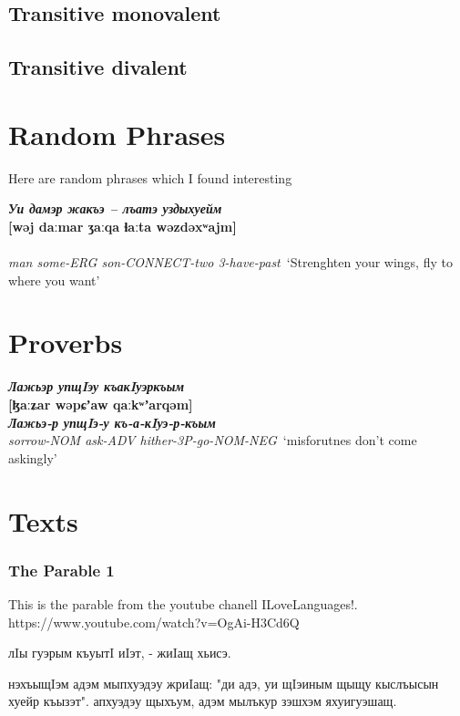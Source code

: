 \documentclass[a4paper,12pt]{book}
\newcommand{\1}[1]{\textbf{\emph{#1}}} %
\newcommand{\2}[1]{\textbf{[#1]}} %
\newcommand{\3}[1]{\fontsize{11pt}{0cm}\textbf{\emph{#1}}} %
\newcommand{\4}[1]{\fontsize{10pt}{0cm}\emph{#1}}	%
\newcommand{\5}[1]{\textbf{/#1/}} %
\newcommand{\6}[1]{\textbf{[#1]}} %
\newcommand{\7}[1]{\fontsize{12pt}{0cm}\emph{#1}} %
\newcommand{\8}[1]{\fontsize{12pt}{0cm}`#1'} %
\newcommand{\9}[1]{\fontsize{12pt}{0cm}(lit. `#1')} %
\begin{document}
\section{Transitive monovalent}
\section{Transitive divalent}
\chapter{Random Phrases}
Here are random phrases which I found interesting

\begin{exe}
\ex
\1{Уи дамэр жакъэ – лъатэ уздыхуейм}\\
\2{wəj daːmar ʒaːqa ɬaːta wəzdəxʷajm}\\
\3{}\\
\4{man some-ERG son-CONNECT-two 3-have-past}\
\trans \8{Strenghten your wings, fly to where you want}
\end{exe}
\chapter{Proverbs}
\begin{exe}
\ex
\1{Лажьэр упщIэу къакIуэркъым}\\
\2{ɮaːʑar wəpɕʼaw qaːkʷʼarqəm}\\
\3{Лажьэ-р упщIэ-у къ-а-кIуэ-р-къым}\\
\4{sorrow-NOM ask-ADV hither-3P-go-NOM-NEG}\
\trans \8{misforutnes don't come askingly}
\end{exe}
\chapter{Texts}
\subsection{The Parable 1}
This is the parable from the youtube chanell ILoveLanguages!. https://www.youtube.com/watch?v=OgAi-H3Cd6Q

лIы гуэрым къуытI иIэт, - жиIащ хьисэ.

нэхъыщIэм адэм мыпхуэдэу жриIащ: "ди адэ, уи щIэиным щыщу кыслъысын хуейр къызэт". апхуэдэу щыхъум, адэм мылъкур зэшхэм яхуигуэшащ.
\end{document}
